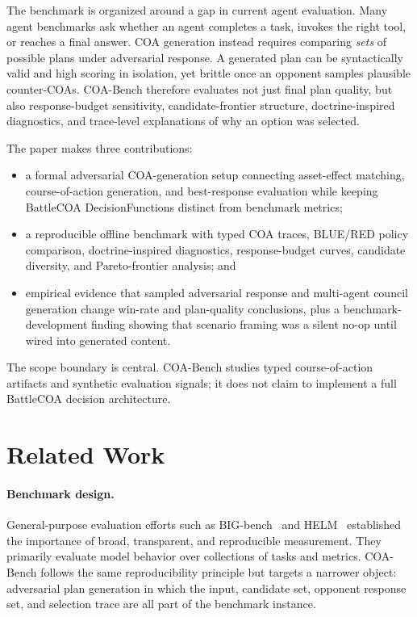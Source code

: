 \documentclass[letterpaper]{article}
\begin{document}
The benchmark is organized around a gap in current agent evaluation. Many agent benchmarks ask whether an agent completes a task, invokes the right tool, or reaches a final answer. COA generation instead requires comparing \emph{sets} of possible plans under adversarial response. A generated plan can be syntactically valid and high scoring in isolation, yet brittle once an opponent samples plausible counter-COAs. COA-Bench therefore evaluates not just final plan quality, but also response-budget sensitivity, candidate-frontier structure, doctrine-inspired diagnostics, and trace-level explanations of why an option was selected.

The paper makes three contributions:

\begin{itemize}
    \item a formal adversarial COA-generation setup connecting asset-effect matching, course-of-action generation, and best-response evaluation while keeping BattleCOA DecisionFunctions distinct from benchmark metrics;
    \item a reproducible offline benchmark with typed COA traces, BLUE/RED policy comparison, doctrine-inspired diagnostics, response-budget curves, candidate diversity, and Pareto-frontier analysis; and
    \item empirical evidence that sampled adversarial response and multi-agent council generation change win-rate and plan-quality conclusions, plus a benchmark-development finding showing that scenario framing was a silent no-op until wired into generated content.
\end{itemize}

The scope boundary is central. COA-Bench studies typed course-of-action artifacts and synthetic evaluation signals; it does not claim to implement a full BattleCOA decision architecture.

\section{Related Work}

\paragraph{Benchmark design.}
General-purpose evaluation efforts such as BIG-bench~\citep{srivastava2023beyond} and HELM~\citep{liang2023holistic} established the importance of broad, transparent, and reproducible measurement. They primarily evaluate model behavior over collections of tasks and metrics. COA-Bench follows the same reproducibility principle but targets a narrower object: adversarial plan generation in which the input, candidate set, opponent response set, and selection trace are all part of the benchmark instance.
\end{document}
